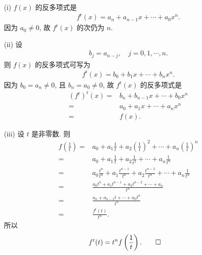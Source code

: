 \begin{pf}
    (i) $f(x)$ 的反多项式是
    \begin{align*}
        f^{\mathrm{r}} (x) = a_n + a_{n-1} x + \cdots + a_0 x^n.
    \end{align*}
    因为 $a_0 \neq 0$, 故 $f^{\mathrm{r}} (x)$ 的次仍为 $n$.

    (ii) 设
    \begin{align*}
        b_j = a_{n - j}, \quad j = 0,1,\cdots,n.
    \end{align*}
    则 $f(x)$ 的反多项式可写为
    \begin{align*}
        f^{\mathrm{r}} (x) = b_0 + b_1 x + \cdots + b_n x^n.
    \end{align*}
    因为 $b_0 = a_n \neq 0$, 且 $b_n = a_0 \neq 0$, 故 $f^{\mathrm{r}}(x)$ 的反多项式是
    \begin{align*}
        (f^{\mathrm{r}})^{\mathrm{r}} (x)
        = {} & b_n + b_{n-1} x + \cdots + b_0 x^n \\
        = {} & a_0 + a_1 x + \cdots + a_n x^n     \\
        = {} & f(x).
    \end{align*}

    (iii) 设 $t$ 是非零数. 则
    \begin{align*}
        f \left( \frac{1}{t} \right)
        = {} & a_0 + a_1 \frac{1}{t} + a_2 \left( \frac{1}{t} \right)^2 + \cdots + a_n \left( \frac{1}{t} \right)^n \\
        = {} & a_0 + a_1 \frac{1}{t} + a_2 \frac{1}{t^2} + \cdots + a_n \frac{1}{t^n}                               \\
        = {} & a_0 \frac{t^n}{t^n} + a_1 \frac{t^{n-1}}{t^n} + a_2 \frac{t^{n-2}}{t^n} + \cdots + a_n \frac{1}{t^n} \\
        = {} & \frac{a_0 t^n + a_1 t^{n-1} + a_2 t^{n-2} + \cdots + a_n}{t^n}                                       \\
        = {} & \frac{a_n + a_{n-1} t + \cdots + a_0 t^n}{t^n}                                                       \\
        = {} & \frac{f^{\mathrm{r}} (t)}{t^n}.
    \end{align*}
    所以
    \begin{align*}
         & f^{\mathrm{r}} (t) = t^n f \left( \frac{1}{t} \right). \qedhere
    \end{align*}
\end{pf}

